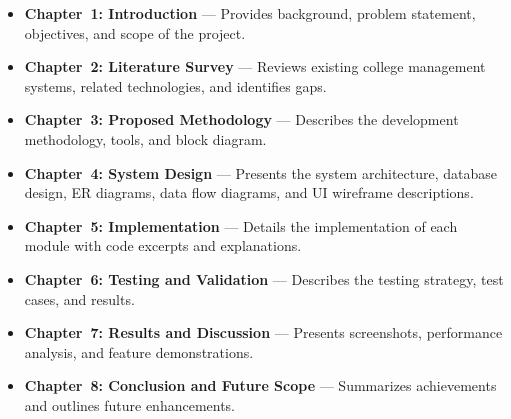 \begin{itemize}[leftmargin=2em]
    \item \textbf{Chapter~1: Introduction} --- Provides background, problem statement, objectives, and scope of the project.
    \item \textbf{Chapter~2: Literature Survey} --- Reviews existing college management systems, related technologies, and identifies gaps.
    \item \textbf{Chapter~3: Proposed Methodology} --- Describes the development methodology, tools, and block diagram.
    \item \textbf{Chapter~4: System Design} --- Presents the system architecture, database design, ER diagrams, data flow diagrams, and UI wireframe descriptions.
    \item \textbf{Chapter~5: Implementation} --- Details the implementation of each module with code excerpts and explanations.
    \item \textbf{Chapter~6: Testing and Validation} --- Describes the testing strategy, test cases, and results.
    \item \textbf{Chapter~7: Results and Discussion} --- Presents screenshots, performance analysis, and feature demonstrations.
    \item \textbf{Chapter~8: Conclusion and Future Scope} --- Summarizes achievements and outlines future enhancements.
\end{itemize}